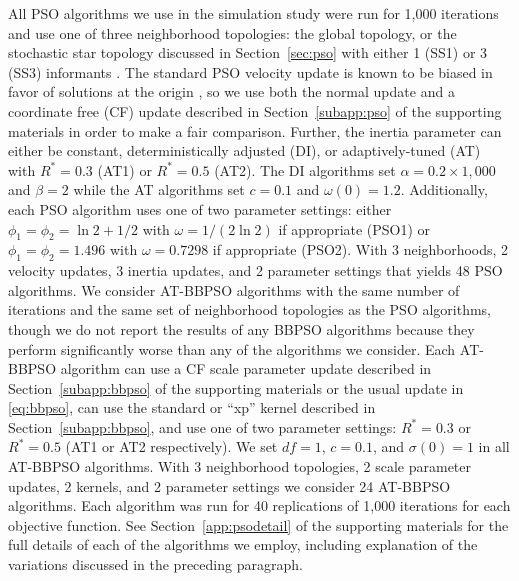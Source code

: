 \documentclass[cmbright]{staauth}
\begin{document}
All PSO algorithms we use in the simulation study were run for 1,000 iterations and use one of three neighborhood topologies: the global topology, or the stochastic star topology discussed in Section~\ref{sec:pso} with either 1 (SS1) or 3 (SS3) informants \citep{miranda2008stochastic}. The standard PSO velocity update is known to be biased in favor of solutions at the origin \cite[e.g.,][]{monson2005exposing, spears2010biases}, so we use both the normal update and a coordinate free (CF) update described in Section~\ref{subapp:pso} of the supporting materials in order to make a fair comparison. Further, the inertia parameter can either be constant, deterministically adjusted (DI), or adaptively-tuned (AT) with $R^*=0.3$ (AT1) or $R^*=0.5$ (AT2). The DI algorithms set $\alpha=0.2\times 1,000$ and $\beta=2$ while the AT algorithms set $c=0.1$ and $\omega(0)=1.2$. Additionally, each PSO algorithm uses one of two parameter settings: either $\phi_1=\phi_2=\ln2 + 1/2$ with $\omega=1/(2\ln2)$ if appropriate (PSO1) or $\phi_1=\phi_2=1.496$ with $\omega=0.7298$ if appropriate (PSO2). With 3 neighborhoods, 2 velocity updates, 3 inertia updates, and 2 parameter settings that yields 48 PSO algorithms. We consider AT-BBPSO algorithms with the same number of iterations and the same set of neighborhood topologies as the PSO algorithms, though we do not report the results of any BBPSO algorithms because they perform significantly worse than any of the algorithms we consider. Each AT-BBPSO algorithm can use a CF scale parameter update described in Section~\ref{subapp:bbpso} of the supporting materials or the usual update in \eqref{eq:bbpso}, can use the standard or ``xp'' kernel described in Section~\ref{subapp:bbpso}, and use one of two parameter settings: $R^*=0.3$ or $R^*=0.5$ (AT1 or AT2 respectively). We set $df=1$, $c=0.1$, and $\sigma(0)=1$ in all AT-BBPSO algorithms. With 3 neighborhood topologies, 2 scale parameter updates, 2 kernels, and 2 parameter settings we consider 24 AT-BBPSO algorithms. Each algorithm was run for 40 replications of 1,000 iterations for each objective function. See Section~\ref{app:psodetail} of the supporting materials for the full details of each of the algorithms we employ, including explanation of the variations discussed in the preceding paragraph.
\end{document}
